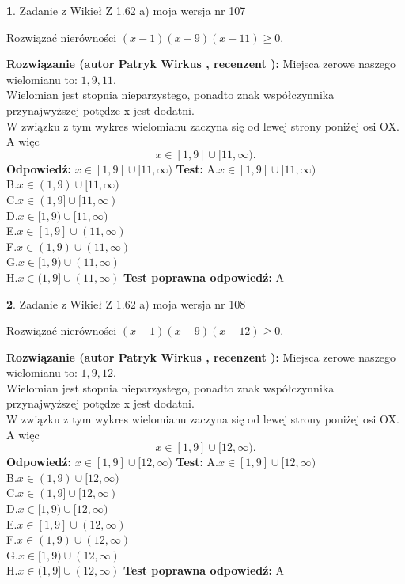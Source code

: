 \documentclass[12pt, a4paper]{article}
\theoremstyle{definition} %
\newtheorem{zad}{}
\newcommand{\zadStart}[1]{\begin{zad}#1\newline}
\newcommand{\zadStop}{\end{zad}}
\newcommand{\rozwStart}[2]{\noindent \textbf{Rozwiązanie (autor #1 , recenzent #2): }\newline}
\newcommand{\rozwStop}{\newline}
\newcommand{\odpStart}{\noindent \textbf{Odpowiedź:}\newline}
\newcommand{\odpStop}{\newline}
\newcommand{\testStart}{\noindent \textbf{Test:}\newline}
\newcommand{\testStop}{\newline}
\newcommand{\kluczStart}{\noindent \textbf{Test poprawna odpowiedź:}\newline}
\newcommand{\kluczStop}{\newline}
\begin{document}
\zadStart{Zadanie z Wikieł Z 1.62 a) moja wersja nr 107}

Rozwiązać nierówności $(x-1)(x-9)(x-11)\ge0$.
\zadStop
\rozwStart{Patryk Wirkus}{}
Miejsca zerowe naszego wielomianu to: $1, 9, 11$.\\
Wielomian jest stopnia nieparzystego, ponadto znak współczynnika przy\linebreak najwyższej potędze x jest dodatni.\\ W związku z tym wykres wielomianu zaczyna się od lewej strony poniżej osi OX. A więc $$x \in [1,9] \cup [11,\infty).$$
\rozwStop
\odpStart
$x \in [1,9] \cup [11,\infty)$
\odpStop
\testStart
A.$x \in [1,9] \cup [11,\infty)$\\
B.$x \in (1,9) \cup [11,\infty)$\\
C.$x \in (1,9] \cup [11,\infty)$\\
D.$x \in [1,9) \cup [11,\infty)$\\
E.$x \in [1,9] \cup (11,\infty)$\\
F.$x \in (1,9) \cup (11,\infty)$\\
G.$x \in [1,9) \cup (11,\infty)$\\
H.$x \in (1,9] \cup (11,\infty)$
\testStop
\kluczStart
A
\kluczStop



\zadStart{Zadanie z Wikieł Z 1.62 a) moja wersja nr 108}

Rozwiązać nierówności $(x-1)(x-9)(x-12)\ge0$.
\zadStop
\rozwStart{Patryk Wirkus}{}
Miejsca zerowe naszego wielomianu to: $1, 9, 12$.\\
Wielomian jest stopnia nieparzystego, ponadto znak współczynnika przy\linebreak najwyższej potędze x jest dodatni.\\ W związku z tym wykres wielomianu zaczyna się od lewej strony poniżej osi OX. A więc $$x \in [1,9] \cup [12,\infty).$$
\rozwStop
\odpStart
$x \in [1,9] \cup [12,\infty)$
\odpStop
\testStart
A.$x \in [1,9] \cup [12,\infty)$\\
B.$x \in (1,9) \cup [12,\infty)$\\
C.$x \in (1,9] \cup [12,\infty)$\\
D.$x \in [1,9) \cup [12,\infty)$\\
E.$x \in [1,9] \cup (12,\infty)$\\
F.$x \in (1,9) \cup (12,\infty)$\\
G.$x \in [1,9) \cup (12,\infty)$\\
H.$x \in (1,9] \cup (12,\infty)$
\testStop
\kluczStart
A
\kluczStop
\end{document}
